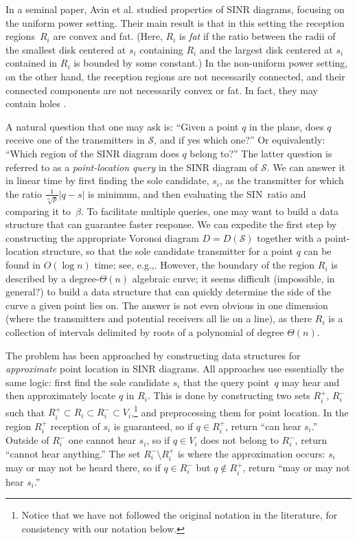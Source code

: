 \documentclass[11pt]{article}
\theoremstyle{remark}
\def\S{\mathcal{S}}
\begin{document}
In a seminal paper, Avin et  al. \cite{aeklpr-sdciawn-12} studied properties of SINR diagrams, focusing on the uniform power setting. Their main result is that in this setting the reception regions~$R_i$ are convex and fat. (Here, $R_i$ is \emph{fat} if the ratio between the radii of the smallest disk centered at $s_i$ containing $R_i$ and the largest disk centered at $s_i$ contained in $R_i$ is bounded by some constant.) In the non-uniform power setting, on the other hand, the reception regions are not necessarily connected, and their connected components are not necessarily convex or fat.  In fact, they may contain holes \cite{klpp-twn-11}.

A natural question that one may ask is: ``Given a point $q$ in the plane, does $q$ receive one of the transmitters in $\S$, and if yes which one?'' 
Or equivalently: ``Which region of the SINR diagram does $q$ belong to?'' The latter question is referred to as a \emph{point-location query} in the SINR diagram of $\S$. 
We can answer it in linear time by first finding the sole candidate, $s_i$, as the transmitter for which the ratio $\frac{1}{\sqrt[\alpha]{p}}|q-s|$ is minimum, and then evaluating the SIN~ratio and comparing it to~$\beta$.  To facilitate multiple queries, one may want to build a data structure that can guarantee faster response.
We can expedite the first step by constructing the appropriate Voronoi diagram $D=D(\S)$ 
together with a point-location structure, so that the sole candidate transmitter for a point $q$ can be found in $O(\log n)$ time; see, e.g.,\cite{AKL-VD}.
However, the boundary of the region $R_i$ is described by a degree-$\Theta(n)$ algebraic curve; it seems difficult (impossible, in general?) to build a data structure that can quickly determine the side of the curve a given point lies on.  The answer is not even obvious in one dimension (where the transmitters and potential receivers all lie on a line), as there $R_i$ is a collection of intervals delimited by roots of a polynomial of degree $\Theta(n)$. 

The problem has been approached by constructing data structures for \emph{approximate} point location in SINR diagrams.  All approaches use essentially the same logic: first find the sole candidate $s_i$ that the query point~$q$ may hear and then approximately locate $q$ in $R_i$.  This is done by constructing two sets $R_i^+$, $R_i^-$ such that $R_i^+ \subset R_i \subset R_i^- \subset V_i$,\footnote{Notice that we have not followed the original notation in the literature, for consistency with our notation below.}
and preprocessing them for point location.
In the region $R_i^+$ reception of $s_i$ is guaranteed, so if $q \in R_i^+$, return ``can hear $s_i$.''  Outside of $R_i^-$ one cannot hear $s_i$, so if $q \in V_i$ does not belong to $R_i^-$, return ``cannot hear anything.''  The set $R_i^- \setminus R_i^+$ is where the approximation occurs: $s_i$ may or may not be heard there, so if $q \in R_i^-$ but $q \not \in R_i^+$, return ``may or may not hear $s_i$.''
\end{document}
